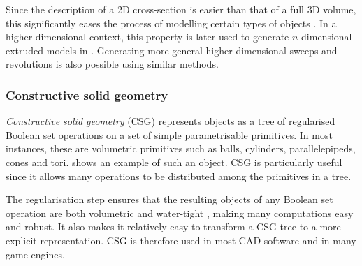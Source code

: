 Since the description of a 2D cross-section is easier than that of a full 3D volume, this significantly eases the process of modelling certain types of objects \citep{Weld90}.
In a higher-dimensional context, this property is later used to generate $n$-dimensional extruded models in .
Generating more general higher-dimensional sweeps and revolutions is also possible using similar methods.

\subsubsection{Constructive solid geometry}

\emph{Constructive solid geometry} (CSG) \citep[\S{}12.3]{Requicha77} represents objects as a tree of regularised Boolean set operations on a set of simple parametrisable primitives.
In most instances, these are volumetric primitives such as balls, cylinders, parallelepipeds, cones and tori.
 shows an example of such an object.
CSG is particularly useful since it allows many operations to be distributed among the primitives in a tree.

The regularisation step ensures that the resulting objects of any Boolean set operation are both volumetric and water-tight \citep{Requicha78}, making many computations easy and robust.
It also makes it relatively easy to transform a CSG tree to a more explicit representation.
CSG is therefore used in most CAD software and in many game engines.

